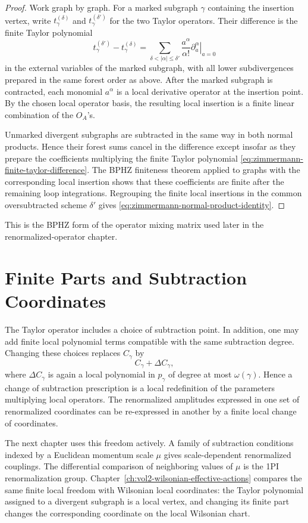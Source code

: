 \begin{proof}
Work graph by graph.  For a marked subgraph \(\gamma\) containing the
insertion vertex, write \(t_\gamma^{(\delta)}\) and
\(t_\gamma^{(\delta')}\) for the two Taylor operators.  Their difference is
the finite Taylor polynomial
\begin{equation}
  t_\gamma^{(\delta')}-t_\gamma^{(\delta)}
  =
  \sum_{\delta<|\alpha|\le\delta'}
  \frac{a^\alpha}{\alpha!}
  \left.\partial_a^\alpha\right|_{a=0}
  \label{eq:zimmermann-finite-taylor-difference}
\end{equation}
in the external variables of the marked subgraph, with all lower
subdivergences prepared in the same forest order as above.  After the marked
subgraph is contracted, each monomial \(a^\alpha\) is a local derivative
operator at the insertion point.  By the chosen local operator basis, the
resulting local insertion is a finite linear combination of the \(O_A\)'s.

Unmarked divergent subgraphs are subtracted in the same way in both normal
products.  Hence their forest sums cancel in the difference except insofar as
they prepare the coefficients multiplying the finite Taylor polynomial
\eqref{eq:zimmermann-finite-taylor-difference}.  The BPHZ finiteness theorem
applied to graphs with the corresponding local insertion shows that these
coefficients are finite after the remaining loop integrations.  Regrouping
the finite local insertions in the common oversubtracted scheme \(\delta'\)
gives \eqref{eq:zimmermann-normal-product-identity}.
\end{proof}

This is the BPHZ form of the operator mixing matrix used later in the
renormalized-operator chapter.

\section{Finite Parts and Subtraction Coordinates}

The Taylor operator includes a choice of subtraction point.  In addition, one
may add finite local polynomial terms compatible with the same subtraction
degree.  Changing these choices replaces \(C_\gamma\) by
\[
  C_\gamma+\Delta C_\gamma,
\]
where \(\Delta C_\gamma\) is again a local polynomial in \(p_\gamma\) of degree
at most \(\omega(\gamma)\).  Hence a change of subtraction prescription is a
local redefinition of the parameters multiplying local operators.  The
renormalized amplitudes expressed in one set of renormalized coordinates can be
re-expressed in another by a finite local change of coordinates.

The next chapter uses this freedom actively.  A family of subtraction
conditions indexed by a Euclidean momentum scale \(\mu\) gives
scale-dependent renormalized couplings.  The differential comparison of
neighboring values of \(\mu\) is the 1PI renormalization group.
Chapter~\ref{ch:vol2-wilsonian-effective-actions} compares the same
finite local freedom with Wilsonian local coordinates: the Taylor polynomial
assigned to a divergent subgraph is a local vertex, and changing its finite
part changes the corresponding coordinate on the local Wilsonian chart.
